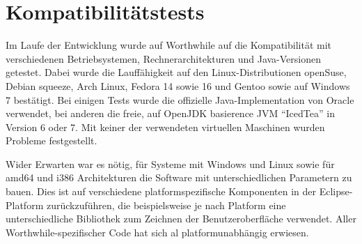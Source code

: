 \section{Kompatibilitätstests}
Im Laufe der Entwicklung wurde auf Worthwhile auf die Kompatibilität mit verschiedenen Betriebsystemen, Rechnerarchitekturen und Java-Versionen getestet. Dabei wurde die Lauffähigkeit auf den Linux-Distributionen openSuse, Debian squeeze, Arch Linux, Fedora 14 sowie 16 und Gentoo sowie auf Windows 7 bestätigt. Bei einigen Tests wurde die offizielle Java-Implementation von Oracle verwendet, bei anderen die freie, auf OpenJDK basierence JVM ``IcedTea'' in Version 6 oder 7. Mit keiner der verwendeten virtuellen Maschinen wurden Probleme festgestellt.

Wider Erwarten war es nötig, für Systeme mit Windows und Linux sowie für amd64 und i386 Architekturen die Software mit unterschiedlichen Parametern zu bauen. Dies ist auf verschiedene platformspezifische Komponenten in der Eclipse-Platform zurückzuführen, die beispielsweise je nach Platform eine unterschiedliche Bibliothek zum Zeichnen der Benutzeroberfläche verwendet. Aller Worthwhile-spezifischer Code hat sich al platformunabhängig erwiesen.
